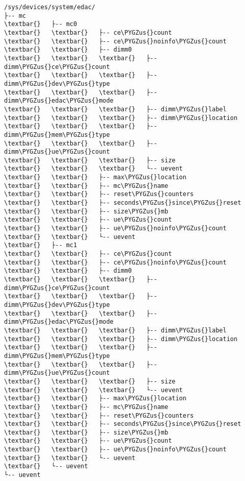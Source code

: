 \documentclass[a4paper,8pt,english]{sphinxmanual}
\def\PYGZus{\char`\_}
\begin{document}
\begin{Verbatim}[commandchars=\\\{\}]
/sys/devices/system/edac/
├-- mc
\textbar{}   ├-- mc0
\textbar{}   \textbar{}   ├-- ce\PYGZus{}count
\textbar{}   \textbar{}   ├-- ce\PYGZus{}noinfo\PYGZus{}count
\textbar{}   \textbar{}   ├-- dimm0
\textbar{}   \textbar{}   \textbar{}   ├-- dimm\PYGZus{}ce\PYGZus{}count
\textbar{}   \textbar{}   \textbar{}   ├-- dimm\PYGZus{}dev\PYGZus{}type
\textbar{}   \textbar{}   \textbar{}   ├-- dimm\PYGZus{}edac\PYGZus{}mode
\textbar{}   \textbar{}   \textbar{}   ├-- dimm\PYGZus{}label
\textbar{}   \textbar{}   \textbar{}   ├-- dimm\PYGZus{}location
\textbar{}   \textbar{}   \textbar{}   ├-- dimm\PYGZus{}mem\PYGZus{}type
\textbar{}   \textbar{}   \textbar{}   ├-- dimm\PYGZus{}ue\PYGZus{}count
\textbar{}   \textbar{}   \textbar{}   ├-- size
\textbar{}   \textbar{}   \textbar{}   └-- uevent
\textbar{}   \textbar{}   ├-- max\PYGZus{}location
\textbar{}   \textbar{}   ├-- mc\PYGZus{}name
\textbar{}   \textbar{}   ├-- reset\PYGZus{}counters
\textbar{}   \textbar{}   ├-- seconds\PYGZus{}since\PYGZus{}reset
\textbar{}   \textbar{}   ├-- size\PYGZus{}mb
\textbar{}   \textbar{}   ├-- ue\PYGZus{}count
\textbar{}   \textbar{}   ├-- ue\PYGZus{}noinfo\PYGZus{}count
\textbar{}   \textbar{}   └-- uevent
\textbar{}   ├-- mc1
\textbar{}   \textbar{}   ├-- ce\PYGZus{}count
\textbar{}   \textbar{}   ├-- ce\PYGZus{}noinfo\PYGZus{}count
\textbar{}   \textbar{}   ├-- dimm0
\textbar{}   \textbar{}   \textbar{}   ├-- dimm\PYGZus{}ce\PYGZus{}count
\textbar{}   \textbar{}   \textbar{}   ├-- dimm\PYGZus{}dev\PYGZus{}type
\textbar{}   \textbar{}   \textbar{}   ├-- dimm\PYGZus{}edac\PYGZus{}mode
\textbar{}   \textbar{}   \textbar{}   ├-- dimm\PYGZus{}label
\textbar{}   \textbar{}   \textbar{}   ├-- dimm\PYGZus{}location
\textbar{}   \textbar{}   \textbar{}   ├-- dimm\PYGZus{}mem\PYGZus{}type
\textbar{}   \textbar{}   \textbar{}   ├-- dimm\PYGZus{}ue\PYGZus{}count
\textbar{}   \textbar{}   \textbar{}   ├-- size
\textbar{}   \textbar{}   \textbar{}   └-- uevent
\textbar{}   \textbar{}   ├-- max\PYGZus{}location
\textbar{}   \textbar{}   ├-- mc\PYGZus{}name
\textbar{}   \textbar{}   ├-- reset\PYGZus{}counters
\textbar{}   \textbar{}   ├-- seconds\PYGZus{}since\PYGZus{}reset
\textbar{}   \textbar{}   ├-- size\PYGZus{}mb
\textbar{}   \textbar{}   ├-- ue\PYGZus{}count
\textbar{}   \textbar{}   ├-- ue\PYGZus{}noinfo\PYGZus{}count
\textbar{}   \textbar{}   └-- uevent
\textbar{}   └-- uevent
└-- uevent
\end{Verbatim}
\end{document}
